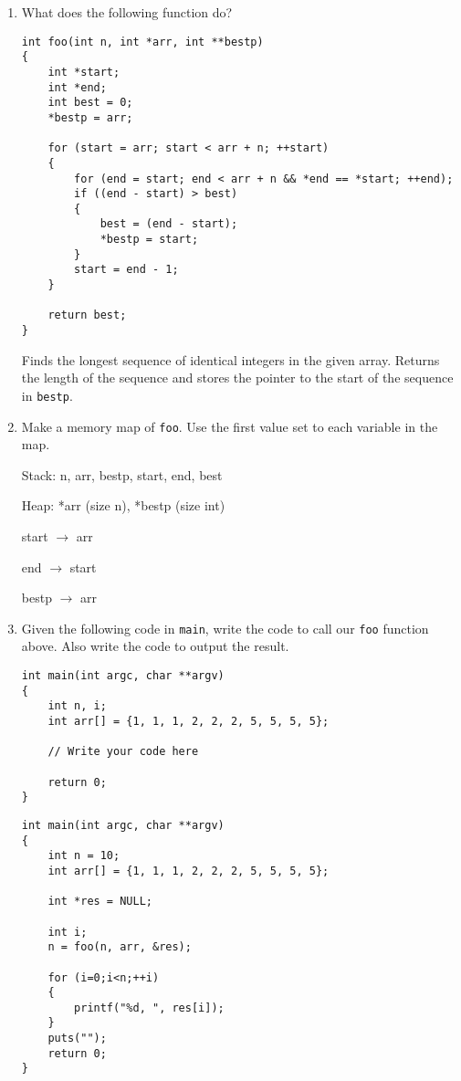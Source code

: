%
%


\begin{enumerate}
\item What does the following function do?

\begin{lstlisting}
int foo(int n, int *arr, int **bestp)
{
	int *start;
	int *end;
	int best = 0;
	*bestp = arr;
	
	for (start = arr; start < arr + n; ++start)
	{
		for (end = start; end < arr + n && *end == *start; ++end);
		if ((end - start) > best)
		{
			best = (end - start);
			*bestp = start;
		}
		start = end - 1;
	}
	
	return best;
}
\end{lstlisting}

\begin{answer}
Finds the longest sequence of identical integers in the given array.
Returns the length of the sequence and stores the pointer to the start of the sequence in \texttt{bestp}.
\end{answer}

\item Make a memory map of \texttt{foo}. Use the first value set to each variable in the map.

\begin{answer}
Stack: n, arr, bestp, start, end, best

Heap: *arr (size n), *bestp (size int)

start $\rightarrow$ arr

end $\rightarrow$ start

bestp $\rightarrow$ arr
\end{answer}

\item Given the following code in \texttt{main}, write the code to call our \texttt{foo} function above.
Also write the code to output the result.
\begin{lstlisting}[numbers=none]
int main(int argc, char **argv)
{
	int n, i;
	int arr[] = {1, 1, 1, 2, 2, 2, 5, 5, 5, 5};

	// Write your code here

	return 0;
}
\end{lstlisting}
\begin{answer}
\begin{lstlisting}[basicstyle=\tiny]
int main(int argc, char **argv)
{
	int n = 10;
	int arr[] = {1, 1, 1, 2, 2, 2, 5, 5, 5, 5};

	int *res = NULL;

	int i;
	n = foo(n, arr, &res);

	for (i=0;i<n;++i)
	{
		printf("%d, ", res[i]);
	}
	puts("");
	return 0;
}
\end{lstlisting}
\end{answer}
\end{enumerate}
